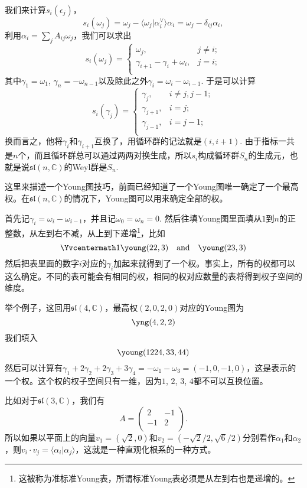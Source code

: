 \documentclass[9pt]{extarticle}
\newcommand{\cc}{\mathbb{C}}
\begin{document}
\para 我们来计算$s_i(\epsilon_j)$，
\[
	s_i(\omega_j)=\omega_j-\langle \omega_j|\alpha^\vee_i\rangle\alpha_i=\omega_j-\delta_{ij}\alpha_i,
\]
利用$\alpha_{i}=\sum_j A_{ij}\omega_j$，我们可以求出
\[
	s_i(\omega_j)=
	\begin{cases}
	\omega_j, & j\neq i;\\
	\gamma_{i+1}-\gamma_{i}+\omega_{i}, & j=i;\\
	\end{cases}
\]
其中$\gamma_{1}=\omega_1$, $\gamma_n=-\omega_{n-1}$以及除此之外$\gamma_i=\omega_{i}-\omega_{i-1}$. 于是可以计算
\[
	s_i(\gamma_{j})=
	\begin{cases}
	\gamma_{j}, & i\neq j,j-1;\\
	\gamma_{j+1}, & i=j;\\
	\gamma_{j-1}, & i=j-1;\\
	\end{cases}
\]
换而言之，他将$\gamma_i$和$\gamma_{i+1}$互换了，用循环群的记法就是$(i,i+1)$. 由于指标一共是$n$个，而且循环群总可以通过两两对换生成，所以$s_i$构成循环群$S_n$的生成元，也就是说$\mathfrak{sl}(n,\cc)$的Weyl群是$S_n$.

\para 这里来描述一个Young图技巧，前面已经知道了一个Young图唯一确定了一个最高权。在$\mathfrak{sl}(n,\cc)$的情况下，Young图可以用来确定全部的权。

首先记$\gamma_i=\omega_i-\omega_{i-1}$，并且记$\omega_0=\omega_n=0$. 然后往填Young图里面填从$1$到$n$的正整数，从左到右不减，从上到下递增\footnote{这被称为准标准Young表，所谓标准Young表必须是从左到右也是递增的。}，比如
\[
\Yvcentermath1
	\young(22,3)\quad \text{and}\quad \young(23,3)
\]
然后把表里面的数字$i$对应的$\gamma_i$加起来就得到了一个权。事实上，所有的权都可以这么确定。不同的表可能会有相同的权，相同的权对应数量的表将得到权子空间的维度。

举个例子，这回用$\mathfrak{sl}(4,\cc)$，最高权$(2,0,2,0)$对应的Young图为
\[
	\yng(4,2,2)
\]
我们填入
\[
	\young(1224,33,44)
\]
然后可以计算有$\gamma_1+2\gamma_2+2\gamma_3+3\gamma_4=-\omega_1-\omega_3=(-1,0,-1,0)$，这是表示的一个权。这个权的权子空间只有一维，因为$1$, $2$, $3$, $4$都不可以互换位置。


\para 比如对于$\mathfrak{sl}(3,\cc)$，我们有
\[
	A=\begin{pmatrix}
	2&-1\\
	-1&2\\
	\end{pmatrix}.
\]
所以如果以平面上的向量$v_1=(\sqrt{2},0)$和$v_2=(-\sqrt{2}/2,\sqrt{6}/2)$分别看作$\alpha_1$和$\alpha_2$，则$v_i\cdot v_j=\langle \alpha_i|\alpha_j\rangle$，这就是一种直观化根系的一种方式。
\end{document}
